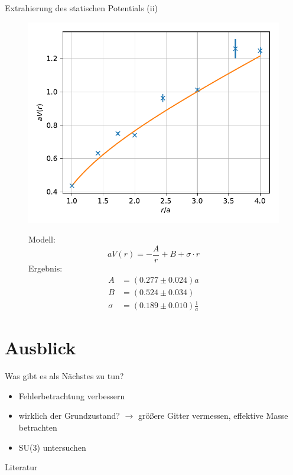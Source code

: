 \documentclass[ngerman]{beamer}
\begin{document}
\begin{frame}{Extrahierung des statischen Potentials (ii)}
\begin{figure}
    \centering
	\includegraphics[width=.6\textwidth]{aVfitBeta23.pdf}
	\begin{minipage}[b]{.35\textwidth}
		Modell:
		\[
		a V(r) = -\frac{A}{r} + B + \sigma \cdot r
		\]
		Ergebnis:
		\begin{align*}
		A &= (0.277 \pm 0.024) a\\
		B &= (0.524 \pm 0.034) \\
		\sigma &= (0.189\pm 0.010) \frac{1}{a}
		\end{align*}
	\end{minipage}
\end{figure}
\end{frame}

\section{Ausblick}

\begin{frame}{Was gibt es als Nächstes zu tun?}
\begin{itemize}
	\item Fehlerbetrachtung verbessern
	\item wirklich der Grundzustand? $\rightarrow$ größere Gitter vermessen, effektive Masse betrachten
	\item SU(3) untersuchen
\end{itemize}
\end{frame}

\begin{frame}{Literatur}
\printbibliography
\end{frame}
  
\end{document}
